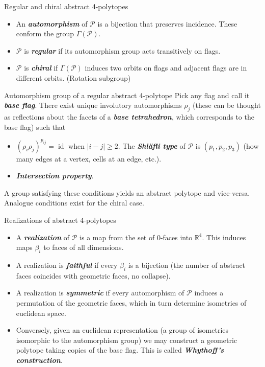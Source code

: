 \begin{frame}{Regular and chiral abstract 4-polytopes}
\begin{itemize}
\item An \textit{\textbf{automorphism}} of $\mathcal{P}$ is a bijection that preserves incidence. These conform the group $\Gamma(\mathcal{P})$.
\item $\mathcal{P}$ is \textit{\textbf{regular}} if its automorphism group acts transitively on flags.
\item $\mathcal{P}$ is \textit{\textbf{chiral}} if $\Gamma(\mathcal{P})$ induces two orbits on flags and adjacent flags are in different orbits. (Rotation subgroup)
\end{itemize}
\end{frame}

\begin{frame}{Automorphism group of a regular abstract 4-polytope}
	Pick any flag and call it \textit{\textbf{base flag}}. There exist unique involutory automorphisms $\rho_j$ (these can be thought as reflections about the facets of a \textit{\textbf{base tetrahedron}}, which corresponds to the base flag) such that
	\begin{itemize}
		\item $(\rho_i\rho_j)^{p_{ij}}=\operatorname{id}$ when $|i-j| \geq 2$. The \textit{\textbf{Shl\"afli type}} of  $\mathcal{P}$ is $(p_1,p_2,p_3)$ (how many edges at a vertex, cells at an edge, etc.).
		\item \textit{\textbf{Intersection property}}.
	\end{itemize}
	A group satisfying these conditions yields an abstract polytope and vice-versa. Analogue conditions exist for the chiral case.
\end{frame}

\begin{frame}{Realizations of abstract 4-polytopes}
\begin{itemize}
\item A \textit{\textbf{realization}} of $\mathcal{P}$ is a map from the set of 0-faces into $\mathbb{R}^4$. This induces maps $\beta_i$ to faces of all dimensions.

\item A realization is \textit{\textbf{faithful}} if every $\beta_i$ is a bijection (the number of abstract faces coincides with geometric faces, no collapse).

\item A realization is \textit{\textbf{symmetric}} if every automorphism of $\mathcal{P}$ induces a permutation of the geometric faces, which in turn determine isometries of euclidean space.

\item Conversely, given an euclidean representation (a group of isometries isomorphic to the automorphism group) we may construct a geometric polytope taking copies of the base flag. This is called \textit{\textbf{Whythoff's construction}}.
\end{itemize}
\end{frame}

